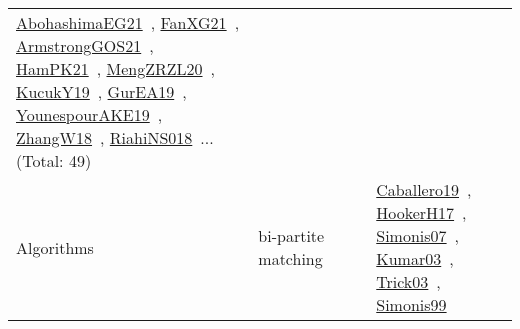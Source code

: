 {\begin{longtable}{lp{3cm}>{\raggedright\arraybackslash}p{6cm}>{\raggedright\arraybackslash}p{6cm}>{\raggedright\arraybackslash}p{8cm}}
\href{../works/AbohashimaEG21.pdf}{AbohashimaEG21}~\cite{AbohashimaEG21}, \href{../works/FanXG21.pdf}{FanXG21}~\cite{FanXG21}, \href{../works/ArmstrongGOS21.pdf}{ArmstrongGOS21}~\cite{ArmstrongGOS21}, \href{../works/HamPK21.pdf}{HamPK21}~\cite{HamPK21}, \href{../works/MengZRZL20.pdf}{MengZRZL20}~\cite{MengZRZL20}, \href{../works/KucukY19.pdf}{KucukY19}~\cite{KucukY19}, \href{../works/GurEA19.pdf}{GurEA19}~\cite{GurEA19}, \href{../works/YounespourAKE19.pdf}{YounespourAKE19}~\cite{YounespourAKE19}, \href{../works/ZhangW18.pdf}{ZhangW18}~\cite{ZhangW18}, \href{../works/RiahiNS018.pdf}{RiahiNS018}~\cite{RiahiNS018}... (Total: 49)\\
\index{bi-partite matching}\index{Algorithms!bi-partite matching}Algorithms & bi-partite matching &  &  & \href{../works/Caballero19.pdf}{Caballero19}~\cite{Caballero19}, \href{../works/HookerH17.pdf}{HookerH17}~\cite{HookerH17}, \href{../works/Simonis07.pdf}{Simonis07}~\cite{Simonis07}, \href{../works/Kumar03.pdf}{Kumar03}~\cite{Kumar03}, \href{../works/Trick03.pdf}{Trick03}~\cite{Trick03}, \href{../works/Simonis99.pdf}{Simonis99}~\cite{Simonis99}\\

\end{longtable}}
